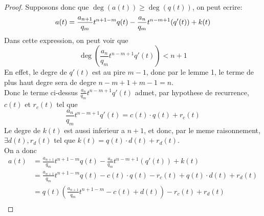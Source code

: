 \documentclass[11pt, a4paper, twoside]{article}
\begin{document}
\begin{proof}
Supposons donc que $\deg(a(t)) \geq \deg(q(t))$, on peut ecrire:
\[ 
a(t) = \frac{a_{n+1}}{q_m} t^{n+1-m} q(t) - \frac{a_n}{q_m} t^{n-m+1} ( q'(t)) + k(t)\\
\]
Dans cette expression, on peut voir que
\[ 
	\deg\left(\frac{a_n}{q_m} t^{n-m+1} q'(t)\right) < n+1
\]
En effet, le degre de $q'(t)$ est au pire $m-1$, donc par le lemme 1, le terme de plus haut degre sera de degre $n-m+1+m-1=n$.\\
Donc le terme ci-dessus $\frac{a_n}{q_m} t^{n-m+1} q'(t)$ admet, par hypothese de recurrence, $c(t)$ et $r_c(t)$ tel que
\[ 
	\frac{a_n}{q_m} t^{n-m+1} q'(t) = c(t) \cdot q(t) + r_c(t)
\]
Le degre de $k(t)$ est aussi inferieur a $n+1$, et donc, par le meme raisonnement, $\exists d(t) , r_d(t)$ tel que $k(t)= q(t)\cdot d(t) + r_d(t)$.\\
On a donc
\begin{align*}
	a(t) &= \frac{a_{n+1}}{q_m} t^{n+1-m} q(t) - \frac{a_n}{q_m} t^{n-m+1} ( q'(t)) + k(t)\\
	     &= \frac{a_{n+1}}{q_m} t^{n+1-m} q(t) - c(t) \cdot q(t) - r_c(t) + q(t) \cdot d(t) + r_d(t)\\
	     &= q(t) \left( \frac{a_{n+1}}{q_m} t^{n+1-m} - c(t) + d(t) \right) - r_c(t) + r_d(t) \\
\end{align*}

\end{proof}
\end{document}
